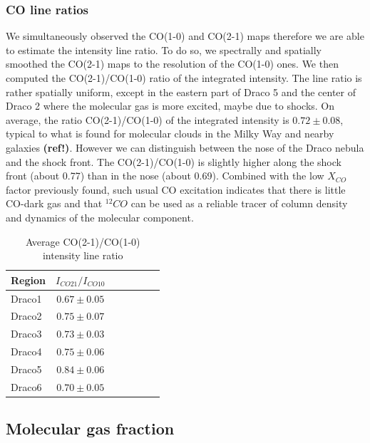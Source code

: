 \documentclass[traditabstract]{aa}
\begin{document}
      \subsubsection{CO line ratios}

   We simultaneously observed the CO(1-0) and CO(2-1) maps therefore we are able to estimate the intensity line ratio. To do so, we spectrally and spatially smoothed the CO(2-1) maps to the resolution of the CO(1-0) ones. We then computed the CO(2-1)/CO(1-0) ratio of the integrated intensity. The line ratio is rather spatially uniform, except in the eastern part of Draco 5 and the center of Draco 2 where the molecular gas is more excited, maybe due to shocks.
On average, the ratio CO(2-1)/CO(1-0) of the integrated intensity is $0.72\pm 0.08$, typical to what is found for molecular clouds in the Milky Way and nearby galaxies \textbf{(ref!)}.
However we can distinguish between the nose of the Draco nebula and the shock front. The CO(2-1)/CO(1-0) is slightly higher along the shock front (about 0.77) than in the nose (about 0.69).
Combined with the low $X_{CO}$ factor previously found, such usual CO excitation indicates that there is little CO-dark gas and that $^{12}CO$ can be used as a reliable tracer of column density and dynamics of the molecular component.

\begin{table}[h]
  \centering
  \caption{Average CO(2-1)/CO(1-0) intensity line ratio}
  \begin{tabular}{lcccccc}
    \hline \hline
    Region & $I_{CO21}/I_{CO10}$ \\ \hline
    Draco1 &   $0.67\pm 0.05$    \\
    Draco2 &   $0.75\pm 0.07$    \\
    Draco3 &   $0.73\pm 0.03$    \\
    Draco4 &   $0.75\pm 0.06$    \\
    Draco5 &   $0.84\pm 0.06$    \\
    Draco6 &   $0.70\pm 0.05$    \\ \hline
  \end{tabular}
\end{table}


   \subsection{Molecular gas fraction}
\end{document}
